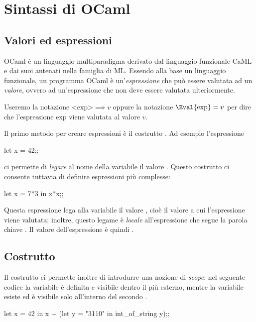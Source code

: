 \chapter{Sintassi di OCaml}

\section{Valori ed espressioni}

OCaml è un linguaggio multiparadigma derivato dal linguaggio funzionale CaML e dai suoi antenati nella famiglia di ML. Essendo alla base un linguaggio funzionale, un programma OCaml è un'\emph{espressione} che può essere valutata ad un \emph{valore}, ovvero ad un'espressione che non deve essere valutata ulteriormente.

Useremo la notazione $\textrm{<exp>} \implies v$ oppure la notazione $\Eval{\textrm{exp}} = v$ per dire che l'espressione $\textrm{exp}$ viene valutata al valore $v$.

Il primo metodo per creare espressioni è il costrutto . Ad esempio l'espressione 
\begin{OCaml}
    let x = 42;;
\end{OCaml}
ci permette di \emph{legare} al nome della variabile  il valore . Questo costrutto ci consente tuttavia di definire espressioni più complesse:
\begin{OCaml}
    let x = 7*3
        in x*x;;
\end{OCaml}
Questa espressione lega alla variabile  il valore , cioè il valore a cui l'espressione  viene valutata; inoltre, questo legame è \emph{locale} all'espressione che segue la parola chiave . Il valore dell'espressione è quindi .

\section{Costrutto }

Il costrutto  ci permette inoltre di introdurre una nozione di \emph{scope}: nel seguente codice la variabile  è definita e visibile dentro il  più esterno, mentre la variabile  esiste ed è visibile solo all'interno del secondo .
\begin{OCaml}
    let x = 42
        in x + (let y = "3110"
                    in int_of_string y);;
\end{OCaml}

